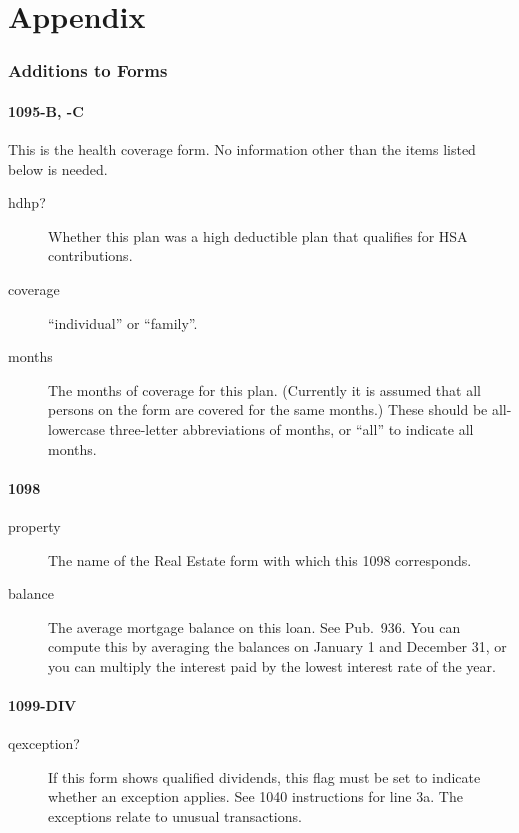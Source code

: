 \documentclass[12pt]{article}
\begin{document}
\appendix

\part*{Appendix}


\section{Additions to Forms}

\subsection{1095-B, -C}

This is the health coverage form. No information other than the items listed
below is needed.

\begin{description}
\item[hdhp?] Whether this plan was a high deductible plan that qualifies for HSA
contributions.
\item[coverage] ``individual'' or ``family''.
\item[months] The months of coverage for this plan. (Currently it is assumed
that all persons on the form are covered for the same months.) These should be
all-lowercase three-letter abbreviations of months, or ``all'' to indicate all
months.
\end{description}

\subsection{1098}

\begin{description}
\item[property] The name of the Real Estate form with which this 1098
corresponds.
\item[balance] The average mortgage balance on this loan. See Pub.\ 936.
You can compute this by averaging the balances on January 1 and December 31, or
you can multiply the interest paid by the lowest interest rate of the year.
\end{description}

\subsection{1099-DIV}

\begin{description}
\item[qexception?] If this form shows qualified dividends, this flag
must be set to indicate whether an exception applies. See 1040 instructions for
line 3a. The exceptions relate to unusual transactions.
\end{description}
\end{document}
